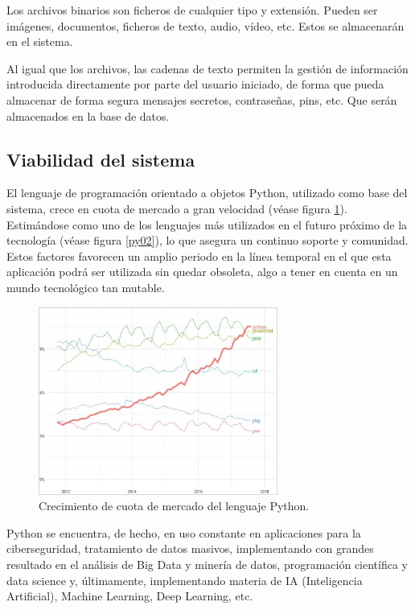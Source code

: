\documentclass[a4paper, 11pt, titlepage]{article}
\begin{document}
            Los archivos binarios son ficheros de cualquier tipo y extensión. Pueden 
            ser imágenes, documentos, ficheros de texto, audio, vídeo, etc. Estos se 
            almacenarán en el sistema.

            Al igual que los archivos, las cadenas de texto permiten la gestión de 
            información introducida directamente por parte del usuario iniciado, de 
            forma que pueda almacenar de forma segura mensajes secretos, contraseñas, 
            pins, etc. Que serán almacenados en la base de datos.

    \subsection{Viabilidad del sistema}

        El lenguaje de programación orientado a objetos Python, utilizado como base 
        del sistema, crece en cuota de mercado a gran velocidad (véase figura \ref{py01}). 
        Estimándose como uno de los lenguajes más utilizados en el futuro próximo de la 
        tecnología (véase figura \ref{py02}), lo que 
        asegura un continuo soporte y comunidad. Estos factores favorecen un amplio 
        periodo en la línea temporal en el que esta aplicación podrá ser utilizada sin 
        quedar obsoleta, algo a tener en cuenta en un mundo tecnológico tan mutable.

        \begin{figure}[htp]
            \centering
            \includegraphics[width=0.7\textwidth]{resources/py01.png}
            \caption{Crecimiento de cuota de mercado del lenguaje Python.}
            \label{py01}
        \end{figure}

        Python se encuentra, de hecho, en uso constante en aplicaciones para la 
        ciberseguridad, tratamiento de datos masivos, implementando con grandes 
        resultado en el análisis de Big Data y minería de datos, programación científica 
        y data science y, últimamente, implementando materia de IA (Inteligencia 
        Artificial), Machine Learning, Deep Learning, etc.
\end{document}
